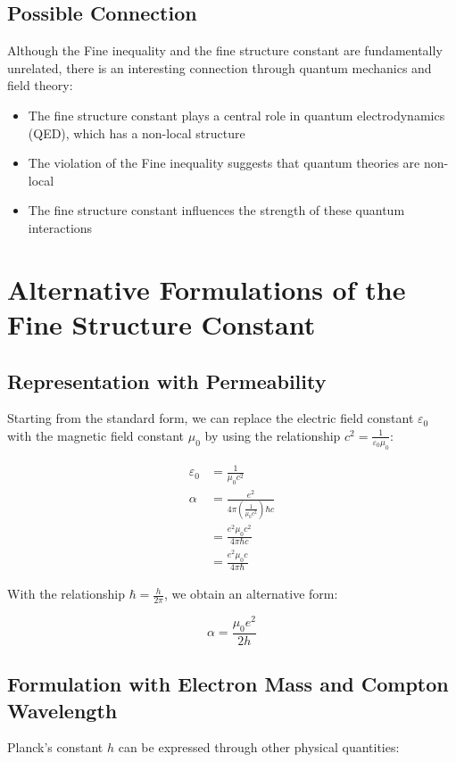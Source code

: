\documentclass{article}
\begin{document}
	\subsection{Possible Connection}
	Although the Fine inequality and the fine structure constant are fundamentally unrelated, there is an interesting connection through quantum mechanics and field theory:
	
	\begin{itemize}
		\item The fine structure constant plays a central role in quantum electrodynamics (QED), which has a non-local structure
		\item The violation of the Fine inequality suggests that quantum theories are non-local
		\item The fine structure constant influences the strength of these quantum interactions
	\end{itemize}
	
	\section{Alternative Formulations of the Fine Structure Constant}
	
	\subsection{Representation with Permeability}
	Starting from the standard form, we can replace the electric field constant $\varepsilon_0$ with the magnetic field constant $\mu_0$ by using the relationship $c^2 = \frac{1}{\varepsilon_0\mu_0}$:
	
	\begin{align}
		\varepsilon_0 &= \frac{1}{\mu_0c^2}\\
		\alpha &= \frac{e^2}{4\pi\left(\frac{1}{\mu_0c^2}\right)\hbar c}\\
		&= \frac{e^2\mu_0c^2}{4\pi\hbar c}\\
		&= \frac{e^2\mu_0c}{4\pi\hbar}
	\end{align}
	
	With the relationship $\hbar = \frac{h}{2\pi}$, we obtain an alternative form:
	
	\begin{equation}
		\alpha = \frac{\mu_0e^2}{2h}
	\end{equation}
	
	\subsection{Formulation with Electron Mass and Compton Wavelength}
	Planck's constant $h$ can be expressed through other physical quantities:
	
\end{document}
